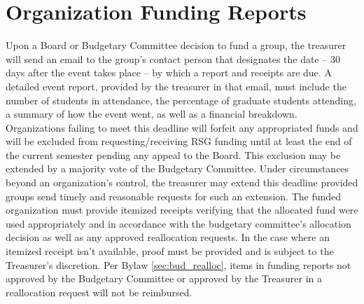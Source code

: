 \section{Organization Funding Reports}
\begin{enumsubsection}
\itemnotoc Upon a Board or Budgetary Committee decision to fund a group, the treasurer will send an email to the group's contact person that designates the date – 30 days after the event takes place – by which a report and receipts are due. A detailed event report, provided by the treasurer in that email, must include the number of students in attendance, the percentage of graduate students attending, a summary of how the event went, as well as a financial breakdown. Organizations failing to meet this deadline will forfeit any appropriated funds and will be excluded from requesting/receiving RSG funding until at least the end of the current semester pending any appeal to the Board. This exclusion may be extended by a majority vote of the Budgetary Committee. Under circumstances beyond an organization's control, the treasurer may extend this deadline provided groups send timely and reasonable requests for such an extension. 
\itemnotoc The funded organization must provide itemized receipts verifying that the allocated fund were used appropriately and in accordance with the budgetary committee's allocation decision as well as any approved reallocation requests. In the case where an itemized receipt isn't available, proof must be provided and is subject to the Treasurer's discretion. 
\itemnotoc Per Bylaw \ref{sec:bud_realloc}, items in funding reports not approved by the Budgetary Committee or approved by the Treasurer in a reallocation request will not be reimbursed. 
\end{enumsubsection}